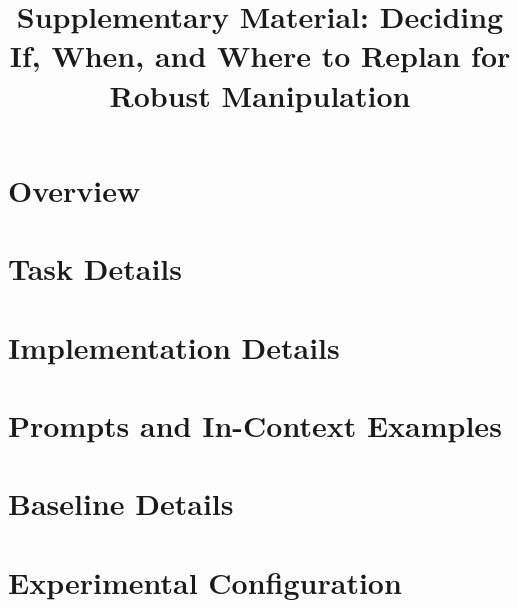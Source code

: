 \documentclass[sigconf,anonymous]{aamas}
\title{Supplementary Material: Deciding If, When, and Where to Replan for Robust Manipulation}
\begin{document}
\sloppy %
\raggedbottom %

\maketitle

\section{Overview}
\label{sec:supp-overview}


\section{Task Details}
\label{sec:supp-tasks}


\section{Implementation Details}
\label{sec:supp-impl}


\onecolumn
\section{Prompts and In-Context Examples}
\label{sec:supp-prompts}

\twocolumn

\section{Baseline Details}
\label{sec:supp-baselines}


\section{Experimental Configuration}
\label{sec:supp-config}

\end{document}
